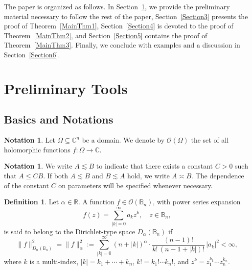 \documentclass[a4paper,12pt]{amsart}
\theoremstyle{definition}
\newtheorem{defn}[thm]{Definition}
\newtheorem{notation}[thm]{Notation}
\theoremstyle{remark}
\begin{document}
        
        
The paper is organized as follows. In Section~\ref{Section2}, we provide the preliminary material necessary to follow the rest of the paper, Section~\ref{Section3} presents the proof of Theorem~\ref{MainThm1}, Section~\ref{Section4} is devoted to the proof of Theorem~\ref{MainThm2}, and Section~\ref{Section5} contains the proof of Theorem~\ref{MainThm3}. Finally, we conclude with examples and a discussion in Section~\ref{Section6}.

\section{Preliminary Tools} \label{Section2}
\subsection{Basics and Notations} \label{Subsec2.1}
\begin{notation}
    Let $\Omega \subseteq \mathbb{C}^n$ be a domain. We denote by $\mathcal{O}(\Omega)$ the set of all holomorphic functions \( f : \Omega \to \mathbb{C} \).
\end{notation}
\begin{notation}
    We write $A \lesssim B$ to indicate that there exists a constant $C > 0$ such that $A \leq C B$. If both $A \lesssim B$ and $B \lesssim A$ hold, we write $A \asymp B$. The dependence of the constant $C$ on parameters will be specified whenever necessary.
\end{notation}

\begin{defn}
    Let \( \alpha \in \mathbb{R} \). A function \( f \in \mathcal{O}(\mathbb{B}_n) \), with power series expansion
    \begin{equation*}
        f(z) = \sum_{|k| = 0}^{\infty} a_k z^k, \quad z \in \mathbb{B}_n,
    \end{equation*}
    is said to belong to the Dirichlet-type space \( D_\alpha(\mathbb{B}_n) \) if
    \begin{equation*}
        \|f\|_{D_\alpha(\mathbb{B}_n)}^2 = \|f\|_{\alpha}^2 := \sum_{|k| = 0}^{\infty} (n + |k|)^\alpha \cdot \frac{(n - 1)!}{k! \, (n - 1 + |k|)!} \, |a_k|^2 < \infty,
    \end{equation*}
    where $k$ is a multi-index, \( |k| = k_1 + \cdots + k_n \), \( k! = k_1! \cdots k_n! \), and  \( z^k = z_1^{k_1} \cdots z_n^{k_n} \).
\end{defn}
\end{document}
